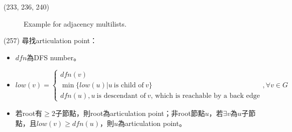 \begin{theorem}{(233, 236, 240)}
\begin{itemize}
\begin{figure}[H]
            \caption{Example for adjacency multilists.}
            \label{img:adj_multilists}
        \end{figure}
    \end{itemize}
\end{theorem}

\item \begin{theorem}{(257)} 尋找articulation point：\begin{itemize}
        \item $dfn$為DFS number。
        \item \begin{equation}
            low(v) = \begin{cases}
                dfn(v) \\
                \min\{low(u) | u \ \text{is child of} \ v\} \\
                dfn(u), u \ \text{is descendant of} \ v\text{, which is reachable by a back edge}
            \end{cases} , \forall v \in G
        \end{equation}
        \item 若root有$\ge 2$子節點，則root為articulation point；非root節點$u$，若$\exists v$為$u$子節點，且$low(v) \ge dfn(u)$，則$u$為articulation point。
    \end{itemize}
\end{theorem}
